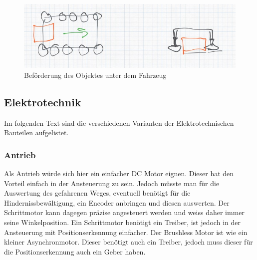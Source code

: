 \begin{figure}[h!]
    \centering
    \begin{minipage}{0.45\textwidth}
        \centering
        \includegraphics[width=\textwidth]{img/technologierecherche/Rotation/waescheanlage.jpg}
        \caption{Beförderung des Objektes unter dem Fahrzeug}
        \label{img:tech_waescheanlage}
    \end{minipage}
    \hfill
\end{figure}





\newpage
\subsection{Elektrotechnik}
Im folgenden Text sind die verschiedenen Varianten der Elektrotechnischen Bauteilen aufgelistet.

\subsubsection{Antrieb}
Als Antrieb würde sich hier ein einfacher DC Motor eignen. Dieser hat den Vorteil einfach in der Ansteuerung zu sein. Jedoch müsste man für die Auswertung des gefahrenen Weges, eventuell benötigt für die Hindernissbewältigung, ein Encoder anbringen und diesen auswerten. Der Schrittmotor kann dagegen präzise angesteuert werden und weiss daher immer seine Winkelposition. Ein Schrittmotor benötigt ein Treiber, ist jedoch in der Ansteuerung mit Positionserkennung einfacher. Der Brushless Motor ist wie ein kleiner Asynchronmotor. Dieser benötigt auch ein Treiber, jedoch muss dieser für die Positionserkennung auch ein Geber haben.

